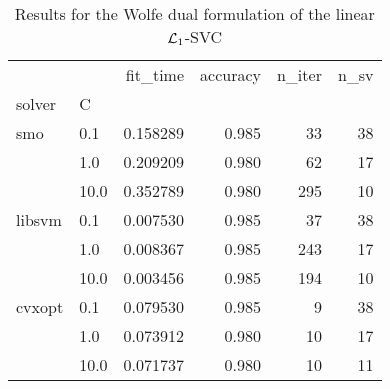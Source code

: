 \begin{table}[H]
\centering
\caption{Results for the Wolfe dual formulation of the linear $\protect \mathcal{L}_1$-SVC}
\label{linear_dual_l1_svc_cv_results}
\begin{tabular}{llrrrr}
\toprule
       &      &  fit\_time &  accuracy &  n\_iter &  n\_sv \\
solver & C &           &           &         &       \\
\midrule
smo & 0.1  &  0.158289 &     0.985 &      33 &    38 \\
       & 1.0  &  0.209209 &     0.980 &      62 &    17 \\
       & 10.0 &  0.352789 &     0.980 &     295 &    10 \\
libsvm & 0.1  &  0.007530 &     0.985 &      37 &    38 \\
       & 1.0  &  0.008367 &     0.985 &     243 &    17 \\
       & 10.0 &  0.003456 &     0.985 &     194 &    10 \\
cvxopt & 0.1  &  0.079530 &     0.985 &       9 &    38 \\
       & 1.0  &  0.073912 &     0.980 &      10 &    17 \\
       & 10.0 &  0.071737 &     0.980 &      10 &    11 \\
\bottomrule
\end{tabular}
\end{table}
